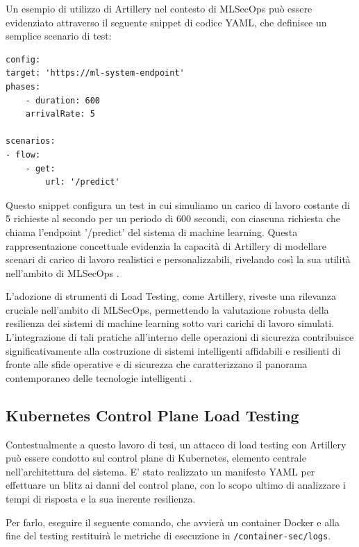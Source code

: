 Un esempio di utilizzo di Artillery nel contesto di MLSecOps può essere evidenziato attraverso il seguente snippet di codice YAML, che definisce un semplice scenario di test:

\begin{code}
\label{code:apx:a:yaml}
\begin{verbatim}
config:
target: 'https://ml-system-endpoint'
phases:
    - duration: 600
    arrivalRate: 5

scenarios:
- flow:
    - get:
        url: '/predict'

\end{verbatim}
\end{code}

Questo snippet configura un test in cui simuliamo un carico di lavoro costante di 5 richieste al secondo per un periodo di 600 secondi, con ciascuna richiesta che chiama l'endpoint '/predict' del sistema di machine learning. Questa rappresentazione concettuale evidenzia la capacità di Artillery di modellare scenari di carico di lavoro realistici e personalizzabili, rivelando così la sua utilità nell'ambito di MLSecOps \cite{artillery_configuration}.

L'adozione di strumenti di Load Testing, come Artillery, riveste una rilevanza cruciale nell'ambito di MLSecOps, permettendo la valutazione robusta della resilienza dei sistemi di machine learning sotto vari carichi di lavoro simulati. L'integrazione di tali pratiche all'interno delle operazioni di sicurezza contribuisce significativamente alla costruzione di sistemi intelligenti affidabili e resilienti di fronte alle sfide operative e di sicurezza che caratterizzano il panorama contemporaneo delle tecnologie intelligenti \cite{mlsecops_load_testing}.

\subsection{Kubernetes Control Plane Load Testing}

Contestualmente a questo lavoro di tesi, un attacco di load testing con Artillery può essere condotto sul control plane di Kubernetes, elemento centrale nell'architettura del sistema. E' stato realizzato un manifesto YAML per effettuare un blitz ai danni del control plane, con lo scopo ultimo di analizzare i tempi di risposta e la sua inerente resilienza. 

Per farlo, eseguire il seguente comando, che avvierà un container Docker e alla fine del testing restituirà le metriche di esecuzione in {\small \verb|/container-sec/logs|}.

